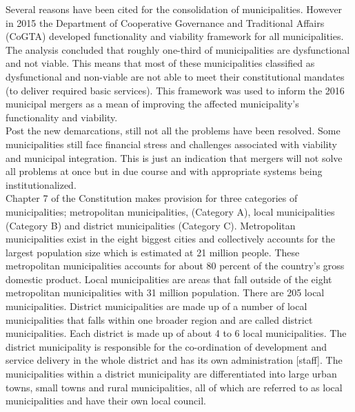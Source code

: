 \documentclass[dvipdfmx]{jsarticle}
\begin{document}
\quad Several reasons have been cited for the consolidation of municipalities. However in 2015 the Department of Cooperative Governance and Traditional Affairs (CoGTA) developed functionality and viability framework for all municipalities. The analysis concluded that roughly one-third of municipalities are dysfunctional and not viable. This means that most of these municipalities classified as dysfunctional and non-viable are not able to meet their constitutional mandates (to deliver required basic services). This framework was used to inform the 2016 municipal mergers as a mean of improving the affected municipality’s functionality and viability. \\
\quad Post the new demarcations, still not all the problems have been resolved. Some municipalities still face financial stress and challenges associated with viability and municipal integration. This is just an indication that mergers will not solve all problems at once but in due course and with appropriate systems being institutionalized.\\
\quad Chapter 7 of the Constitution makes provision for three categories of municipalities; metropolitan municipalities, (Category A), local municipalities (Category B) and district municipalities (Category C). Metropolitan municipalities exist in the eight biggest cities and collectively accounts for the largest population size which is estimated at 21 million people. These metropolitan municipalities accounts for about 80 percent of the country’s gross domestic product. Local municipalities are areas that fall outside of the eight metropolitan municipalities with 31 million population. There are 205 local municipalities. District municipalities are made up of a number of local municipalities that falls within one broader region and are called district municipalities. Each district is made up of about 4 to 6 local municipalities. The district municipality is responsible for the co-ordination of development and service delivery in the whole district and has its own administration [staff]. The municipalities within a district municipality are differentiated into large urban towns, small towns and rural municipalities, all of which are referred to as local municipalities and have their own local council.\\
\end{document}
